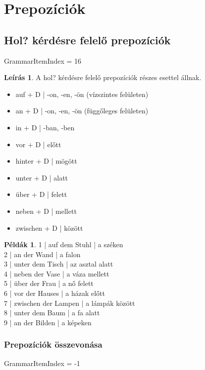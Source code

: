\documentclass{article}
\theoremstyle{definition}
\newtheorem*{exmp}{Példák}
\newtheorem*{desc}{Leírás}
\begin{document}
\section{Prepozíciók}

\subsection{Hol? kérdésre felelő prepozíciók}

GrammarItemIndex = 16

\begin{desc}
A hol? kérdésre felelő prepozíciók részes esettel állnak.

\begin{itemize}
\item auf + D | -on, -en, -ön (vízszintes felületen)
\item an + D | -on, -en, -ön (függőleges felületen)
\item in + D | -ban, -ben
\item vor + D | előtt
\item hinter + D | mögött
\item unter + D | alatt
\item über + D | felett
\item neben + D | mellett
\item zwischen + D | között
\end{itemize}
\end{desc}

\begin{exmp}
1 | auf dem Stuhl | a széken\\
2 | an der Wand | a falon\\
3 | unter dem Tisch | az asztal alatt\\
4 | neben der Vase | a váza mellett\\
5 | über der Frau | a nő felett\\
6 | vor der Hauses | a házak előtt\\
7 | zwischen der Lampen | a lámpák között\\
8 | unter dem Baum | a fa alatt\\
9 | an der Bilden | a képeken\\
\end{exmp}

\subsubsection{Prepozíciók összevonása}

GrammarItemIndex = -1
\end{document}
